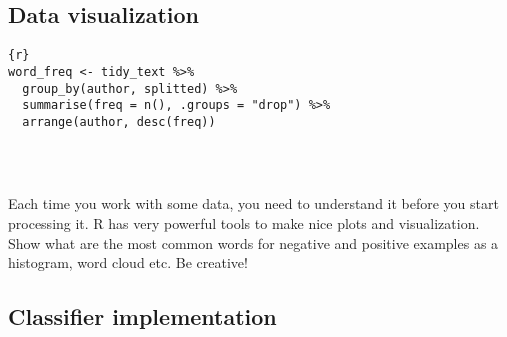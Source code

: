 \documentclass[
]{article}
\begin{document}
\subsection{Data visualization}\label{data-visualization}

\begin{verbatim}
{r}
word_freq <- tidy_text %>%
  group_by(author, splitted) %>%
  summarise(freq = n(), .groups = "drop") %>%
  arrange(author, desc(freq))
  
  
  
\end{verbatim}

Each time you work with some data, you need to understand it before you
start processing it. R has very powerful tools to make nice plots and
visualization. Show what are the most common words for negative and
positive examples as a histogram, word cloud etc. Be creative!

\subsection{Classifier implementation}\label{classifier-implementation}
\end{document}
